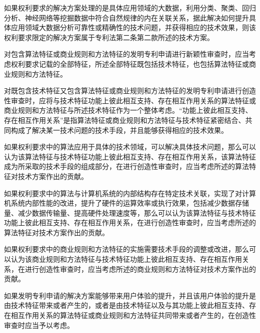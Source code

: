 {\setlength{\parindent}{20.6bp}如果权利要求的解决方案处理的是具体应用领域的大数据，利用分类、聚类、回归分析、神经网络等挖掘数据中符合自然规律的内在关联关系，据此解决如何提升具体应用领域大数据分析可靠性或精确性的技术问题，并获得相应的技术效果，则该权利要求限定的解决方案属于专利法第二条第二款所述的技术方案。\par}

{\setlength{\parindent}{20.6bp}对包含算法特征或商业规则和方法特征的发明专利申请进行新颖性审查时，应当考虑权利要求记载的全部特征，所述全部特征既包括技术特征，也包括算法特征或商业规则和方法特征。\par}

{\setlength{\parindent}{20.6bp}对既包含技术特征又包含算法特征或商业规则和方法特征的发明专利申请进行创造性审查时，应将与技术特征功能上彼此相互支持、存在相互作用关系的算法特征或商业规则和方法特征与所述技术特征作为一个整体考虑。“功能上彼此相互支持、存在相互作用关系”是指算法特征或商业规则和方法特征与技术特征紧密结合、共同构成了解决某一技术问题的技术手段，并且能够获得相应的技术效果。\par}

{\setlength{\parindent}{20.6bp}如果权利要求中的算法应用于具体的技术领域，可以解决具体技术问题，那么可以认为该算法特征与技术特征功能上彼此相互支持、存在相互作用关系，该算法特征成为所采取的技术手段的组成部分，在进行创造性审查时，应当考虑所述的算法特征对技术方案作出的贡献。\par}

{\setlength{\parindent}{20.6bp}如果权利要求中的算法与计算机系统的内部结构存在特定技术关联，实现了对计算机系统内部性能的改进，提升了硬件的运算效率或执行效果，包括减少数据存储量、减少数据传输量、提高硬件处理速度等，那么可以认为该算法特征与技术特征功能上彼此相互支持、存在相互作用关系，在进行创造性审查时，应当考虑所述的算法特征对技术方案作出的贡献。\par}

{\setlength{\parindent}{20.6bp}如果权利要求中的商业规则和方法特征的实施需要技术手段的调整或改进，那么可以认为该商业规则和方法特征与技术特征功能上彼此相互支持、存在相互作用关系，在进行创造性审查时，应当考虑所述的商业规则和方法特征对技术方案作出的贡献。\par}

{\setlength{\parindent}{20.6bp}如果发明专利申请的解决方案能够带来用户体验的提升，并且该用户体验的提升是由技术特征带来或者产生的，或者是由技术特征以及与其功能上彼此相互支持、存在相互作用关系的算法特征或商业规则和方法特征共同带来或者产生的，在创造性审查时应当予以考虑。\par}

